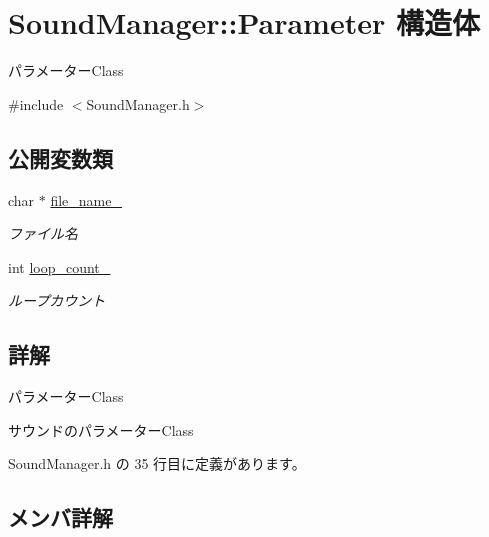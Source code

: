 \hypertarget{struct_sound_manager_1_1_parameter}{}\section{Sound\+Manager\+:\+:Parameter 構造体}
\label{struct_sound_manager_1_1_parameter}


パラメーター\+Class  




{\ttfamily \#include $<$Sound\+Manager.\+h$>$}

\subsection*{公開変数類}
\begin{DoxyCompactItemize}
\item 
char $\ast$ \mbox{\hyperlink{struct_sound_manager_1_1_parameter_acbbc589f34c562320fb9634d75bbe0f4}{file\+\_\+name\+\_\+}}
\begin{DoxyCompactList}\small\item\em ファイル名 \end{DoxyCompactList}\item 
int \mbox{\hyperlink{struct_sound_manager_1_1_parameter_a7bb2608cdf81aabd6a53466bae11cc33}{loop\+\_\+count\+\_\+}}
\begin{DoxyCompactList}\small\item\em ループカウント \end{DoxyCompactList}\end{DoxyCompactItemize}


\subsection{詳解}
パラメーター\+Class 

サウンドのパラメーター\+Class 

 Sound\+Manager.\+h の 35 行目に定義があります。



\subsection{メンバ詳解}
\mbox{\label{struct_sound_manager_1_1_parameter_acbbc589f34c562320fb9634d75bbe0f4}} 
